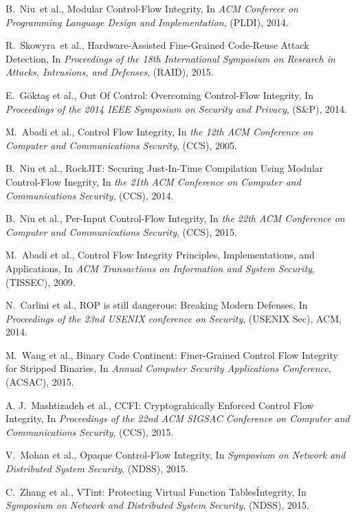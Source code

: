 \documentclass[11pt,a4paper,bibtotoc,idxtotoc,headsepline,footsepline,footexclude,BCOR20mm,DIV10]{scrbook}
\begin{document}
\begin{thebibliography}{50}
B.~Niu~et al., {Modular Control-Flow Integrity}, In
\emph{ACM Conferece on Programming Language Design and Implementation}, (PLDI), 2014.

R.~Skowyra~et al., {Hardware-Assisted Fine-Grained Code-Reuse Attack Detection}, In
\emph{Proceedings of the 18th International Symposium on Research in Attacks, Intrusions, and Defenses},
(RAID), 2015.

E.~G\"{o}kta\c{s} et al., {Out Of Control: Overcoming Control-Flow Integrity}, In
\emph{Proceedings of the 2014 IEEE Symposium on Security and Privacy}, (S\&P), 2014.

M.~Abadi et al., {Control Flow Integrity}, In
\emph{the 12th ACM Conference on Computer and Communications Security}, (CCS), 2005.

B.~Niu et al., {RockJIT: Securing Just-In-Time Compilation Using Modular Control-Flow Inegrity}, In
\emph{the 21th ACM Conference on Computer and Communications Security}, (CCS), 2014.

B.~Niu et al., {Per-Input Control-Flow Integrity}, In
\emph{the 22th ACM Conference on Computer and Communications Security}, (CCS), 2015.

M.~Abadi et al., {Control Flow Integrity Principles, Implementations, and Applications}, In
\emph{ACM Transactions on Information and System Security}, (TISSEC), 2009.

N.~Carlini et al., {ROP is still dangerous: Breaking Modern Defenses}, In
\emph{Proceedings of the 23nd USENIX conference on Security}, (USENIX Sec), ACM, 2014.

M.~Wang et al., {Binary Code Continent: Finer-Grained Control Flow Integrity for Stripped Binaries}, In
\emph{Annual Computer Security Applications Conference}, (ACSAC), 2015.

A. J.~Mashtizadeh et al., {CCFI: Cryptograhically Enforced Control Flow Integrity}, In
\emph{Proceedings of the 22nd ACM SIGSAC Conference on Computer and Communications Security}, (CCS), 2015.

V.~Mohan et al., {Opaque Control-Flow Integrity}, In
\emph{Symposium on Network and Distributed System Security}, (NDSS), 2015.

C.~Zhang et al., {VTint: Protecting Virtual Function Tables\' Integrity}, In
\emph{Symposium on Network and Distributed System Security}, (NDSS), 2015.


\end{thebibliography}
\end{document}
